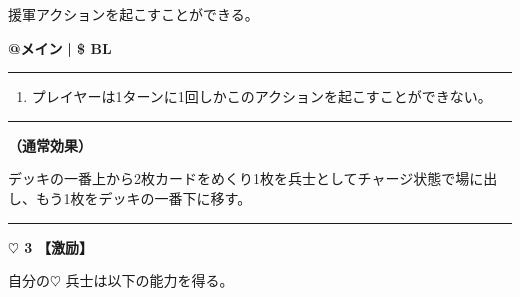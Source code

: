 \documentclass[twocolumn,a5paper,papersize,10pt]{jarticle}
\begin{document}
援軍アクションを起こすことができる。

\begin{tcolorbox}[title={\small\bf【Action】援軍}{\scriptsize （通常魔法）}]

{\scriptsize\bf @メイン }
  {\scriptsize\bf | \$ BL }

\vspace{1mm} %
\hrule height 0.1mm depth 0mm width 62mm %
\vspace{1mm} %


\vspace{-1zh}%
\begin{enumerate}
\renewcommand{\labelenumi}{※}
\setlength{\leftskip}{-0.3cm}
\setlength{\itemsep}{0pt} %
\setlength{\parskip}{0pt} %

\item プレイヤーは1ターンに1回しかこのアクションを起こすことができない。

\vspace{-3mm}%
\end{enumerate}
\vspace{-2mm} %
\vspace{1zh}%
\vspace{1mm} %
\hrule height 0.1mm depth 0mm width 62mm %
\vspace{1mm} %

{\bf（通常効果）}

デッキの一番上から2枚カードをめくり1枚を兵士としてチャージ状態で場に出し、もう1枚をデッキの一番下に移す。

\vspace{1mm} %
\end{tcolorbox}

\vspace{-1zh}

 
 
 
 
 

\vspace{3mm} %
\hrule height 0.5mm depth 0mm width 66.5mm %
\vspace{1mm} %
{\Large\bf $\heartsuit$ 3} {\normalsize\bf【激励】} %
\vspace{1mm} %

自分の{\normalsize $\heartsuit$} 兵士は以下の能力を得る。
\end{document}
